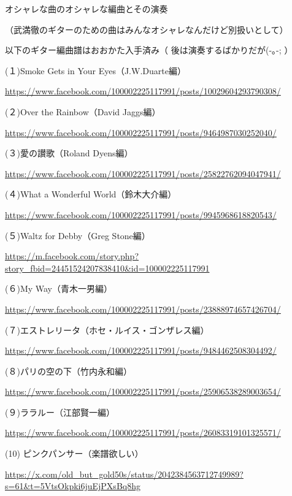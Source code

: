 \documentclass[facebook_diary.tex]{subfiles}
\begin{document}
オシャレな曲のオシャレな編曲とその演奏

（武満徹のギターのための曲はみんなオシャレなんだけど別扱いとして）

以下のギター編曲譜はおおかた入手済み（ 後は演奏するばかりだが(-｡-; ）


(１)Smoke Gets in Your Eyes（J.W.Duarte編）

\url{https://www.facebook.com/100002225117991/posts/10029604293790308/}




(２)Over the Rainbow（David Jaggs編）

\url{https://www.facebook.com/100002225117991/posts/9464987030252040/}




(３)愛の讃歌（Roland Dyens編）

\url{https://www.facebook.com/100002225117991/posts/25822762094047941/}




(４)What a Wonderful World（鈴木大介編）

\url{https://www.facebook.com/100002225117991/posts/9945968618820543/}




(５)Waltz for Debby（Greg Stone編）

\url{https://m.facebook.com/story.php?story_fbid=24451524207838410&id=100002225117991}




(６)My Way（青木一男編）

\url{https://www.facebook.com/100002225117991/posts/23888974657426704/}




(７)エストレリータ（ホセ・ルイス・ゴンザレス編）

\url{https://www.facebook.com/100002225117991/posts/9484462508304492/}




(８)パリの空の下（竹内永和編）

\url{https://www.facebook.com/100002225117991/posts/25906538289003654/}




(９)ララルー（江部賢一編）

\url{https://www.facebook.com/100002225117991/posts/26083319101325571/}




(10) ピンクパンサー（楽譜欲しい）

\url{https://x.com/old_but_gold50s/status/2042384563712749989?s=61&t=5VtsOkpki6juEjPXsBq8hg}
\end{document}
